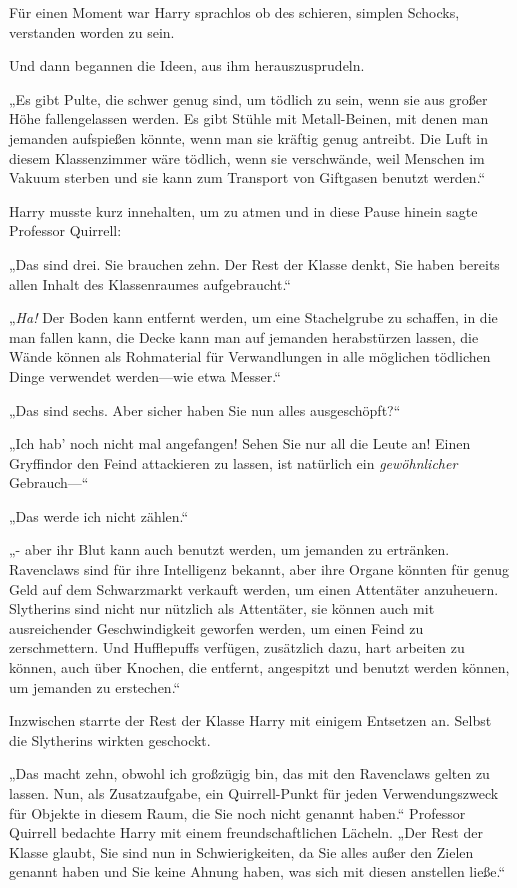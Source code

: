 {Für einen Moment war Harry sprachlos ob des schieren, simplen Schocks, verstanden worden zu sein.

Und dann begannen die Ideen, aus ihm herauszusprudeln.

„Es gibt Pulte, die schwer genug sind, um tödlich zu sein, wenn sie aus großer Höhe fallengelassen werden. Es gibt Stühle mit Metall-Beinen, mit denen man jemanden aufspießen könnte, wenn man sie kräftig genug antreibt. Die Luft in diesem Klassenzimmer wäre tödlich, wenn sie verschwände, weil Menschen im Vakuum sterben und sie kann zum Transport von Giftgasen benutzt werden.“

Harry musste kurz innehalten, um zu atmen und in diese Pause hinein sagte Professor Quirrell:

„Das sind drei. Sie brauchen zehn. Der Rest der Klasse denkt, Sie haben bereits allen Inhalt des Klassenraumes aufgebraucht.“

„\emph{Ha!} Der Boden kann entfernt werden, um eine Stachelgrube zu schaffen, in die man fallen kann, die Decke kann man auf jemanden herabstürzen lassen, die Wände können als Rohmaterial für Verwandlungen in alle möglichen tödlichen Dinge verwendet werden—wie etwa Messer.“

„Das sind sechs. Aber sicher haben Sie nun alles ausgeschöpft?“

„Ich hab' noch nicht mal angefangen! Sehen Sie nur all die Leute an! Einen Gryffindor den Feind attackieren zu lassen, ist natürlich ein \emph{gewöhnlicher} Gebrauch—“

„Das werde ich nicht zählen.“

„- aber ihr Blut kann auch benutzt werden, um jemanden zu ertränken. Ravenclaws sind für ihre Intelligenz bekannt, aber ihre Organe könnten für genug Geld auf dem Schwarzmarkt verkauft werden, um einen Attentäter anzuheuern. Slytherins sind nicht nur nützlich als Attentäter, sie können auch mit ausreichender Geschwindigkeit geworfen werden, um einen Feind zu zerschmettern. Und Hufflepuffs verfügen, zusätzlich dazu, hart arbeiten zu können, auch über Knochen, die entfernt, angespitzt und benutzt werden können, um jemanden zu erstechen.“

Inzwischen starrte der Rest der Klasse Harry mit einigem Entsetzen an. Selbst die Slytherins wirkten geschockt.

„Das macht zehn, obwohl ich großzügig bin, das mit den Ravenclaws gelten zu lassen. Nun, als Zusatzaufgabe, ein Quirrell-Punkt für jeden Verwendungszweck für Objekte in diesem Raum, die Sie noch nicht genannt haben.“ Professor Quirrell bedachte Harry mit einem freundschaftlichen Lächeln. „Der Rest der Klasse glaubt, Sie sind nun in Schwierigkeiten, da Sie alles außer den Zielen genannt haben und Sie keine Ahnung haben, was sich mit diesen anstellen ließe.“

}
